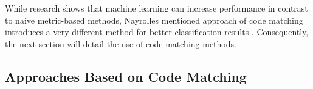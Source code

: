 While research shows that machine learning can increase performance in contrast to naive metric-based methods, Nayrolles mentioned approach of code matching introduces a very different method for better classification results \cite{Nayrolles2018}. Consequently, the next section will detail the use of code matching methods.






\subsection{Approaches Based on Code Matching}%
\label{sec:codematching}
\label{sec:comparison-codematching}

